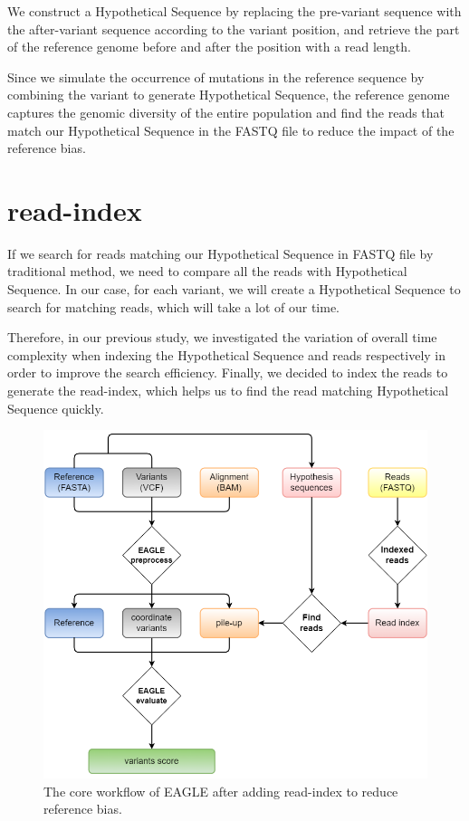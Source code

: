 \documentclass[PhD]{PHlab-thesis}
\begin{document}
We construct a Hypothetical Sequence by replacing the pre-variant sequence with the after-variant sequence according to the variant position, and retrieve the part of the reference genome before and after the position with a read length.

Since we simulate the occurrence of mutations in the reference sequence by combining the variant to generate Hypothetical Sequence, the reference genome captures the genomic diversity of the entire population and find the reads that match our Hypothetical Sequence in the FASTQ file to reduce the impact of the reference bias.
\section{read-index}
If we search for reads matching our Hypothetical Sequence in FASTQ file by traditional method, we need to compare all the reads with Hypothetical Sequence. In our case, for each variant, we will create a Hypothetical Sequence to search for matching reads, which will take a lot of our time.

Therefore, in our previous study, we investigated the variation of overall time complexity when indexing the Hypothetical Sequence and reads respectively in order to improve the search efficiency. Finally, we decided to index the reads to generate the read-index, which helps us to find the read matching Hypothetical Sequence quickly.
\\
\begin{figure}[h!]
	\centering
	\includegraphics[scale=0.7]{figures/afterEAGLE.png}
	\caption{The core workflow of EAGLE after adding read-index to reduce reference bias.}
	\label{fig:EAGLE with read-index} %
\end{figure}
\end{document}

